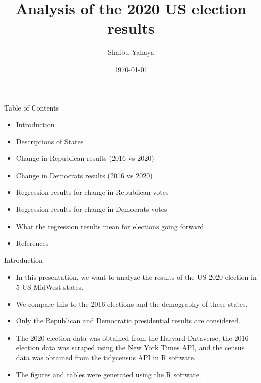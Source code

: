 \documentclass[11pt]{beamer}
\title{Analysis of the 2020 US election results}
\author{Shaibu Yahaya}
\institute{Northern Illinois University}
\date{\today}
\begin{document}
\maketitle


\begin{frame}{Table of Contents}
\begin{itemize}
    \item Introduction
    \item Descriptions of States
    \item Change in Republican results (2016 vs 2020)
    \item Change in Democrats results (2016 vs 2020)
    \item Regression results for change in Republican votes
    \item Regression results for change in Democrats votes
    \item What the regression results mean for elections going forward
    \item References
\end{itemize}
\end{frame}


\begin{frame}{Introduction}
\begin{itemize}
\item In this presentation, we want to analyze the results of the US 2020 election in 5 US MidWest states.
\item We compare this to the 2016 elections and the demography of these states.
\item Only the Republican and Democratic presidential results are considered.
\item The 2020 election data was obtained from the Harvard Dataverse, the 2016 election data was scraped using the New York Times API, and the census data was obtained from the tidycensus API in R software.
\item The figures and tables were generated using the R software.
\end{itemize}
\end{frame}
\end{document}
